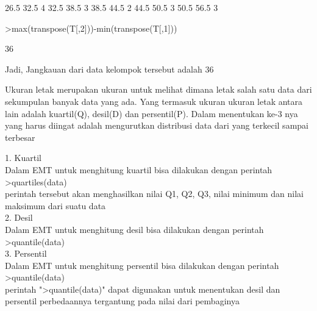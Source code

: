 \documentclass[a4paper,10pt]{article}
\begin{document}
\begin{eulernotebook}
\begin{eulercomment}
\begin{eulercomment}
\begin{eulercomment}
\begin{eulercomment}
\begin{eulercomment}
\begin{eulercomment}
\begin{eulercomment}
\begin{eulercomment}
\begin{eulercomment}
\begin{eulercomment}
\begin{eulercomment}
\begin{eulercomment}
\begin{euleroutput}
         26.5      32.5         4
         32.5      38.5         3
         38.5      44.5         2
         44.5      50.5         3
         50.5      56.5         3
\end{euleroutput}
\begin{eulerprompt}
>max(transpose(T[,2]))-min(transpose(T[,1]))
\end{eulerprompt}
\begin{euleroutput}
  36
\end{euleroutput}
\begin{eulercomment}
Jadi, Jangkauan dari data kelompok tersebut adalah 36
\end{eulercomment}
\begin{eulercomment}
Ukuran letak merupakan ukuran untuk melihat dimana letak salah satu
data dari sekumpulan banyak data yang ada. Yang termasuk ukuran ukuran
letak antara lain adalah kuartil(Q), desil(D) dan persentil(P). Dalam
menentukan ke-3 nya yang harus diingat adalah mengurutkan distribusi
data dari yang terkecil sampai terbesar

1. Kuartil\\
Dalam EMT untuk menghitung kuartil bisa dilakukan dengan perintah\\
\textgreater{}quartiles(data)\\
perintah tersebut akan menghasilkan nilai Q1, Q2, Q3, nilai minimum
dan nilai maksimum dari suatu data\\
2. Desil\\
Dalam EMT untuk menghitung desil bisa dilakukan dengan perintah\\
\textgreater{}quantile(data)\\
3. Persentil\\
Dalam EMT untuk menghitung persentil bisa dilakukan dengan perintah\\
\textgreater{}quantile(data)\\
perintah "\textgreater{}quantile(data)" dapat digunakan untuk menentukan desil dan
persentil perbedaannya tergantung pada nilai dari pembaginya


\end{eulercomment}
\end{eulercomment}
\end{eulercomment}
\end{eulercomment}
\end{eulercomment}
\end{eulercomment}
\end{eulercomment}
\end{eulercomment}
\end{eulercomment}
\end{eulercomment}
\end{eulercomment}
\end{eulercomment}
\end{eulercomment}
\end{eulernotebook}
\end{document}
